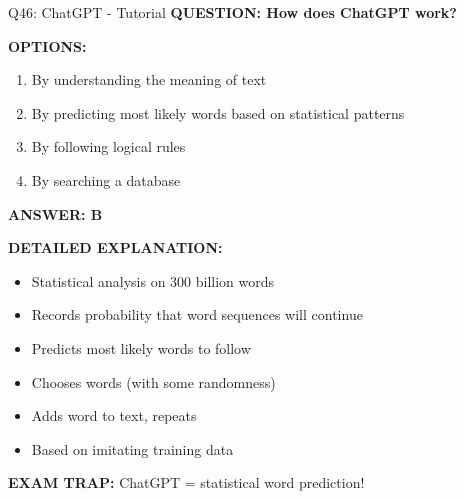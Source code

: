 \documentclass[8pt]{beamer}
\begin{document}
	\begin{frame}{Q46: ChatGPT - Tutorial}
		\fontsize{6.5}{7.5}\selectfont
		\textbf{QUESTION: How does ChatGPT work?}
		
		\vspace{0.1cm}
		\textbf{OPTIONS:}
		\begin{enumerate}
			\item By understanding the meaning of text
			\item By predicting most likely words based on statistical patterns
			\item By following logical rules
			\item By searching a database
		\end{enumerate}
		
		\vspace{0.1cm}
		\textcolor{myblue}{\textbf{ANSWER: B}}
		
		\vspace{0.1cm}
		\textbf{DETAILED EXPLANATION:}
		\begin{itemize}
			\item Statistical analysis on 300 billion words
			\item Records probability that word sequences will continue
			\item Predicts most likely words to follow
			\item Chooses words (with some randomness)
			\item Adds word to text, repeats
			\item Based on imitating training data
		\end{itemize}
		
		\vspace{0.1cm}
		\textcolor{myred}{\textbf{EXAM TRAP:}} ChatGPT = \textcolor{myblue}{statistical word prediction}!
	\end{frame}
	
\end{document}
